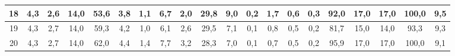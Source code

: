 \begin{sidewaystable}[]
\begin{tabular}{|c|c|c|c|c|c|c|c|c|c|c|c|c|c|c|c|c|c|c|c|}
    18 & 4,3                                              & 2,6                                              & 14,0                                             & 53,6                                             & 3,8                                              & 1,1                                              & 6,7                                              & 2,0                                              & 29,8                                             & 9,0                                              & 0,2                                              & 1,7                                              & 0,6                                              & 0,3                                              & 92,0                                            & 17,0                                            & 17,0                                            & 100,0                                           & 9,5                                             \\ \hline
    19 & 4,3                                              & 2,7                                              & 14,0                                             & 59,3                                             & 4,2                                              & 1,0                                              & 6,1                                              & 2,6                                              & 29,5                                             & 7,1                                              & 0,1                                              & 0,8                                              & 0,5                                              & 0,2                                              & 81,7                                            & 15,0                                            & 14,0                                            & 93,3                                            & 9,3                                             \\ \hline
    20 & 4,3                                              & 2,7                                              & 14,0                                             & 62,0                                             & 4,4                                              & 1,4                                              & 7,7                                              & 3,2                                              & 28,3                                             & 7,0                                              & 0,1                                              & 0,7                                              & 0,5                                              & 0,2                                              & 95,9                                            & 17,0                                            & 17,0                                            & 100,0                                           & 9,1                                             \\ \hline

\end{tabular}
\end{sidewaystable}
